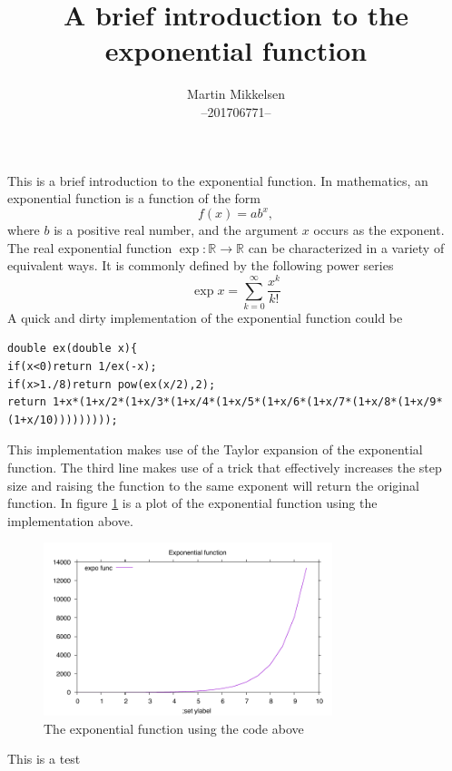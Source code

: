 \documentclass[a4paper,oneside]{memoir}
\newcommand{\R}{\mathbb{R}}
\begin{document}
	\author{Martin Mikkelsen  \\
		--201706771-- \\ }
	\title{A brief introduction to the exponential function}
	\maketitle



	\thispagestyle{firststyle}

This is a brief introduction to the exponential function. In mathematics, an exponential function is a function of the form
\begin{equation} \label{def}
  f(x)=ab^x,
\end{equation}
where $b$ is a positive real number, and the argument $x$  occurs as the exponent. The real exponential function $\exp:\R \rightarrow \R$ can be characterized in a variety of equivalent ways. It is commonly defined by the following power series
\begin{equation}
  \exp{x} = \sum_{k=0}^{\infty} \frac{x^k}{k!}
\end{equation}
A quick and dirty implementation of the exponential function could be
\begin{lstlisting}
double ex(double x){
if(x<0)return 1/ex(-x);
if(x>1./8)return pow(ex(x/2),2);
return 1+x*(1+x/2*(1+x/3*(1+x/4*(1+x/5*(1+x/6*(1+x/7*(1+x/8*(1+x/9*(1+x/10)))))))));
\end{lstlisting}
This implementation makes use of the Taylor expansion of the exponential function. The third line makes use of a trick that effectively increases the step size and raising the function to the same exponent will return the original function.
In figure \ref{Expo} is a plot of the exponential function using the implementation above.
\begin{figure}[H]
  \centering
  \includegraphics[width=0.75\textwidth]{expo}
  \caption{The exponential function using the code above}
  \label{Expo}
\end{figure}
This is a test
\end{document}
